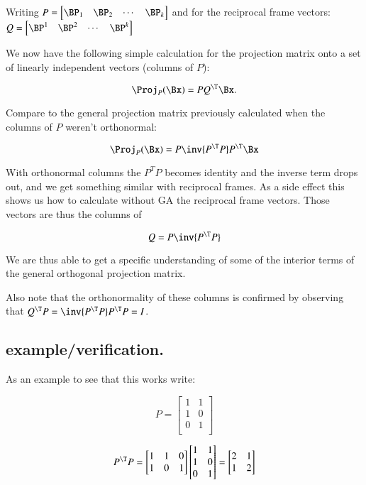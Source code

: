Writing 
$P = 
\begin{bmatrix}
\BP_1 & \BP_2 & \cdots & \BP_k
\end{bmatrix}
$
and for the reciprocal frame vectors:
$Q = 
\begin{bmatrix}
\BP^1 & \BP^2 & \cdots & \BP^k
\end{bmatrix}
$

We now have the following simple calculation for the projection matrix onto a set of linearly independent vectors (columns of $P$):

\begin{equation}
\Proj_P(\Bx) = P Q^\T \Bx.
\end{equation}

Compare to the general projection matrix previously calculated when the columns of $P$ weren't orthonormal:

\begin{equation}
\Proj_P(\Bx) = P \inv{P^\T P} P^\T \Bx
\end{equation}

With orthonormal columns the $P^T P$ becomes identity and the inverse term drops out, and we get something similar with reciprocal frames.  As a side effect this shows us how to calculate without GA the reciprocal frame vectors.  Those vectors
are thus the columns of

\begin{equation}
Q = P \inv{P^\T P}
\end{equation}

We are thus able to get a specific understanding of some of the interior terms of the general orthogonal projection matrix.

Also note that the orthonormality of these columns is confirmed by observing that $Q^\T P = \inv{P^\T P} P^\T P = I$.

\subsection{example/verification. }

As an example to see that this works write:

\[
P = 
\begin{bmatrix}
1 & 1 \\
1 & 0 \\
0 & 1 \\
\end{bmatrix}
\]

\[
P^\T P = 
\begin{bmatrix}
1 & 1 & 0 \\
1 & 0 & 1 \\
\end{bmatrix}
\begin{bmatrix}
1 & 1 \\
1 & 0 \\
0 & 1 \\
\end{bmatrix}
=
\begin{bmatrix}
2 & 1 \\
1 & 2 \\
\end{bmatrix}
\]

